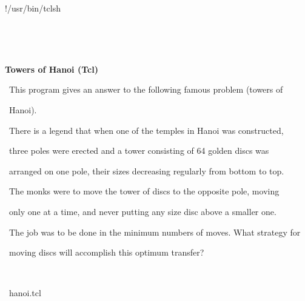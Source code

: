 \documentclass[a4paper,10pt]{article}
\def\mc{\relax}
\begin{document}
\tt\mc 

\noindent
\mbox{}\rm\mc {\tt\#}!/usr/bin/tclsh
\tt\mc 

\noindent
\mbox{}\rm\mc {\tt\#} \hrulefill 
\tt\mc 

\noindent
\mbox{}\rm\mc {\tt\#} \ %
\tt\mc 

\noindent
\mbox{}\rm\mc {\tt\#} \ \centerline{\bf Towers of Hanoi (Tcl)} 
\tt\mc 

\noindent
\mbox{}\rm\mc {\tt\#}  
\tt\mc 

\noindent
\mbox{}\rm\mc {\tt\#} \ \hspace{\leftmargini}This program gives an answer to the following famous problem (towers of 
\tt\mc 

\noindent
\mbox{}\rm\mc {\tt\#} \ \hspace{\leftmargini}Hanoi). 
\tt\mc 

\noindent
\mbox{}\rm\mc {\tt\#} \ \hspace{\leftmargini}There is a legend that when one of the temples in Hanoi was constructed, 
\tt\mc 

\noindent
\mbox{}\rm\mc {\tt\#} \ \hspace{\leftmargini}three poles were erected and a tower consisting of 64 golden discs was 
\tt\mc 

\noindent
\mbox{}\rm\mc {\tt\#} \ \hspace{\leftmargini}arranged on one pole, their sizes decreasing regularly from bottom to top. 
\tt\mc 

\noindent
\mbox{}\rm\mc {\tt\#} \ \hspace{\leftmargini}The monks were to move the tower of discs to the opposite pole, moving 
\tt\mc 

\noindent
\mbox{}\rm\mc {\tt\#} \ \hspace{\leftmargini}only one at a time, and never putting any size disc above a smaller one. 
\tt\mc 

\noindent
\mbox{}\rm\mc {\tt\#} \ \hspace{\leftmargini}The job was to be done in the minimum numbers of moves. What strategy for 
\tt\mc 

\noindent
\mbox{}\rm\mc {\tt\#} \ \hspace{\leftmargini}moving discs will accomplish this optimum transfer? 
\tt\mc 

\noindent
\mbox{}\rm\mc {\tt\#}  \ %
\tt\mc 

\noindent
\mbox{}\rm\mc {\tt\#} \hrulefill\ hanoi.tcl \ \hrulefill
\tt\mc 
\end{document}
